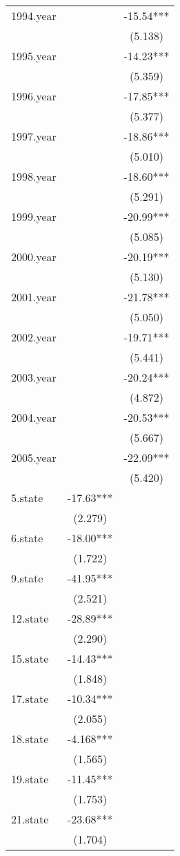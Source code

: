 \begin{tabular}{lcc}
1994.year &  & -15.54*** \\
 &  & (5.138) \\
1995.year &  & -14.23*** \\
 &  & (5.359) \\
1996.year &  & -17.85*** \\
 &  & (5.377) \\
1997.year &  & -18.86*** \\
 &  & (5.010) \\
1998.year &  & -18.60*** \\
 &  & (5.291) \\
1999.year &  & -20.99*** \\
 &  & (5.085) \\
2000.year &  & -20.19*** \\
 &  & (5.130) \\
2001.year &  & -21.78*** \\
 &  & (5.050) \\
2002.year &  & -19.71*** \\
 &  & (5.441) \\
2003.year &  & -20.24*** \\
 &  & (4.872) \\
2004.year &  & -20.53*** \\
 &  & (5.667) \\
2005.year &  & -22.09*** \\
 &  & (5.420) \\
5.state & -17.63*** &  \\
 & (2.279) &  \\
6.state & -18.00*** &  \\
 & (1.722) &  \\
9.state & -41.95*** &  \\
 & (2.521) &  \\
12.state & -28.89*** &  \\
 & (2.290) &  \\
15.state & -14.43*** &  \\
 & (1.848) &  \\
17.state & -10.34*** &  \\
 & (2.055) &  \\
18.state & -4.168*** &  \\
 & (1.565) &  \\
19.state & -11.45*** &  \\
 & (1.753) &  \\
21.state & -23.68*** &  \\
 & (1.704) &  \\

\end{tabular}
